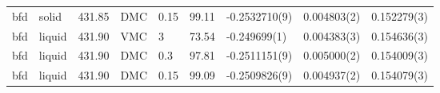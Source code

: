 \begin{tabular}{llrllllll}
   bfd &    solid &                431.85 &    DMC &     0.15 &  99.11 &                         -0.2532710(9) &                     0.004803(2) &                           0.152279(3) \\
   bfd &   liquid &                431.90 &    VMC &        3 &  73.54 &                          -0.249699(1) &                     0.004383(3) &                           0.154636(3) \\
   bfd &   liquid &                431.90 &    DMC &      0.3 &  97.81 &                         -0.2511151(9) &                     0.005000(2) &                           0.154009(3) \\
   bfd &   liquid &                431.90 &    DMC &     0.15 &  99.09 &                         -0.2509826(9) &                     0.004937(2) &                           0.154079(3) \\
\bottomrule
\end{tabular}
